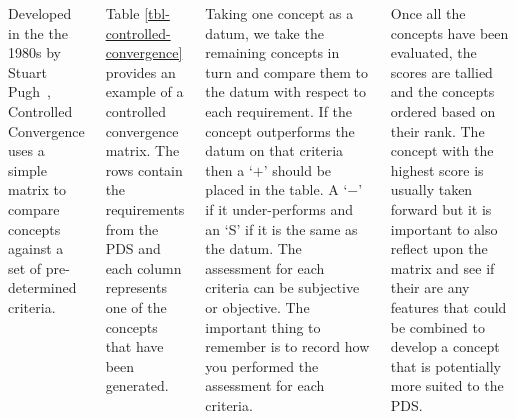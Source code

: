 \documentclass[20pt, a0paper, portrait]{tikzposter}
\begin{document}
\begin{columns}
{      Developed in the the 1980s by Stuart Pugh~\autocite{pugh1993}, Controlled Convergence uses a simple matrix to compare concepts against a set of pre-determined criteria.

      \vspace{1em}

      Table \ref{tbl-controlled-convergence} provides an example of a controlled convergence matrix. The rows contain the requirements from the PDS and each column represents one of the concepts that have been generated.

      \vspace{1em}
      
      Taking one concept as a datum, we take the remaining concepts in turn and compare them to the datum with respect to each requirement. If the concept outperforms the datum on that criteria then a `$+$' should be placed in the table. A `$-$' if it under-performs and an `S' if it is the same as the datum. The assessment for each criteria can be subjective or objective. The important thing to remember is to record how you performed the assessment for each criteria.

      \vspace{1em}
      
      Once all the concepts have been evaluated, the scores are tallied and the concepts ordered based on their rank. The concept with the highest score is usually taken forward but it is important to also reflect upon the matrix and see if their are any features that could be combined to develop a concept that is potentially more suited to the PDS.
    }

\end{columns}
\end{document}
